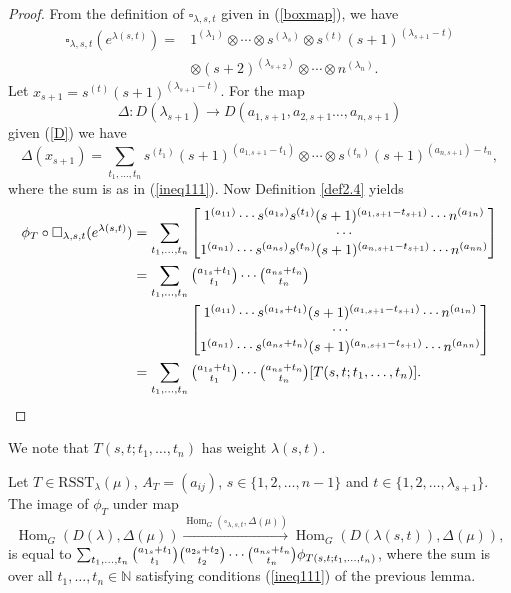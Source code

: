 \documentclass[ALCO,Unicode]{cedram}
\newcommand{\la}{\lambda}
\DeclareMathOperator{\Hom}{Hom}
\numberwithin{equation}{section}
\begin{document}
\begin{proof}
From the definition of $\square_{\la, s,t}$ given in (\ref{boxmap}), we have \begin{align*}\square_{\la, s,t}(e^{\la(s,t)})=&1^{(\lambda_1)}\otimes \cdots \otimes s^{(\lambda_s)}\otimes s^{(t)}(s+1)^{(\lambda_{s+1}-t)}\\&\otimes (s+2)^{(\lambda_{s+2})} \otimes \cdots \otimes n^{(\lambda_n)}.\end{align*}
Let $x_{s+1} = s^{(t)}(s+1)^{(\lambda_{s+1}-t)}$. For the map \[\Delta:  D(\lambda_{s+1}) \to D(a_{1,s+1}, a_{2,s+1} \dots, a_{n, s+1})\] given (\ref{D}) we have \[\Delta(x_{s+1})=\sum_{t_1,\dots,t_n}s^{(t_1)}(s+1)^{(a_{1,s+1}-t_1)}\otimes \cdots \otimes s^{(t_n)}(s+1)^{(a_{n,s+1})-t_n},\] where the sum is as in (\ref{ineq111}). Now Definition \ref{def2.4} yields  \begin{align*}
	\phi_T \circ \square_{\la, s,t}(e^{\la(s,t)})&=\sum_{t_1,\dots, t_n}
	\begin{bmatrix*}[c]
		1^{(a_{11})}\cdots s^{(a_{1s})}s^{(t_1)}(s+1)^{(a_{1,s+1}-t_{s+1})} \cdots n^{(a_{1n})} \\
		\cdots\\
		1^{(a_{n1})} \cdots s^{(a_{ns})}s^{(t_n)}(s+1)^{(a_{n,s+1}-t_{s+1})}\cdots n^{(a_{nn})}  \end{bmatrix*} \\&=\sum_{t_1,\dots,t_{n}}\tbinom{a_{1s}+t_1}{t_1} \cdots \tbinom{a_{ns}+t_n}{t_n}\\&\hspace{40pt}
		\begin{bmatrix*}[c]
			1^{(a_{11})}\cdots s^{(a_{1s}+t_1)}(s+1)^{(a_{1,s+1}-t_{s+1})} \cdots n^{(a_{1n})} \\
			\cdots\\
			1^{(a_{n1})} \cdots s^{(a_{ns}+t_n)}(s+1)^{(a_{n,s+1}-t_{s+1})}\cdots n^{(a_{nn})}  \end{bmatrix*}\\&=\sum_{t_1,\dots,t_{n}}\tbinom{a_{1s}+t_1}{t_1} \cdots \tbinom{a_{ns}+t_n}{t_n}[T(s,t;t_1,\dots,t_{n})]. \qedhere
\end{align*} \end{proof}
We note that $T(s,t;t_1,\dots,t_{n})$ has weight $\la(s,t)$.
\begin{coro}\label{corhom} Let $T \in \mathrm{RSST}_{\la}(\mu)$, $A_T=(a_{ij})$, $s \in \{1,2,\dots,n-1\}$ and $t \in \{1,2,\dots,\la_{s+1}\}$. The image of $\phi_T$ under map 
\[\Hom_G(D(\lambda),\Delta(\mu)) \xrightarrow{\Hom_G(\square_{\la, s, t},\Delta({\mu}))} \Hom_G(D(\la({s,t})),\Delta(\mu)),\] 
is equal to $\sum_{t_1,\dots,t_{n}}\tbinom{a_{1s}+t_1}{t_1}\tbinom{a_{2s}+t_2}{t_2} \cdots \tbinom{a_{ns}+t_n}{t_n}\phi_{T(s,t;t_1,\dots,t_{n})}$,
where the sum is over all $t_1,\dots,t_{n} \in \mathbb{N}$ satisfying conditions (\ref{ineq111}) of the previous lemma.\end{coro}
\end{document}
